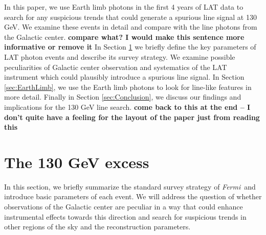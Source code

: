 \documentclass[aps,twocolumn,prd,superscriptaddress,showpacs,nofootinbib,fixfloat]{revtex4}
\newcommand{\Fermi}{{\slshape Fermi}}
\newcommand\Refsec[1]{Section \ref{sec:#1}}
\begin{document}
In this paper, we use Earth limb photons in the first 4 years of LAT data to
search for any
suspicious trends that could generate a spurious line signal
at 130 GeV.  We examine these events in detail and compare
with the line photons from the Galactic center.  {\bf compare what?  I would
  make this sentence more informative or remove it}  In
\Refsec{130GeV} we briefly define the key parameters
of LAT photon events and describe its survey strategy. We
examine possible peculiarities of Galactic center
observation and systematics of the LAT instrument which could plausibly 
introduce a spurious line signal. In
\Refsec{EarthLimb}, we use the Earth limb photons to look for line-like features
in more detail.  Finally in \Refsec{Conclusion}, we discuss
our findings and implications for the 130 GeV line search.
{\bf come back to this at the end -- I don't quite have a feeling for the
  layout of the paper just from reading this}



\section{The 130 GeV excess}
\label{sec:130GeV}
In this section, we briefly summarize the standard survey strategy of \Fermi\ 
and introduce basic parameters of each event.  We will
address the question of whether observations of the Galactic center
are peculiar in a way that could enhance instrumental
effects towards this direction and search for suspicious trends in
other regions of the sky and the reconstruction parameters.

\end{document}
